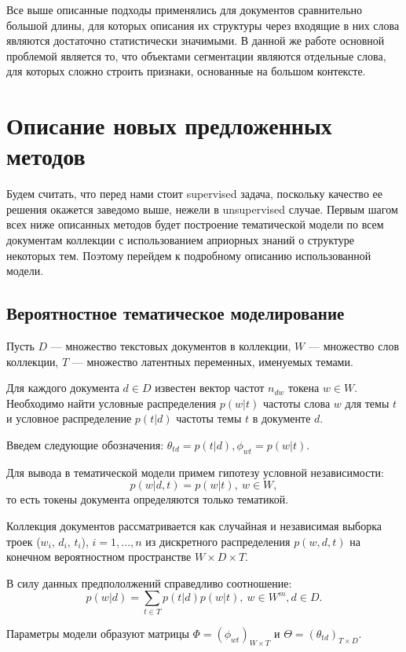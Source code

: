 \documentclass[pdftex,ptm,12pt,a4paper]{report}
\theoremstyle{definition}
\begin{document}
Все выше описанные подходы применялись для документов сравнительно большой длины, для которых описания их структуры через входящие в них слова являются достаточно статистически значимыми. В данной же работе основной проблемой является то, что объектами сегментации являются отдельные слова, для которых сложно строить признаки, основанные на большом контексте. 

\chapter{Описание новых предложенных методов}

Будем считать, что перед нами стоит supervised задача, поскольку качество ее решения окажется заведомо выше, нежели в unsupervised случае. Первым шагом всех ниже описанных методов будет построение тематической модели по всем документам коллекции с использованием априорных знаний о структуре некоторых тем. Поэтому перейдем к подробному описанию использованной модели.

\section{Вероятностное тематическое моделирование}

Пусть $D$ --- множество текстовых документов в коллекции, $W$ --- множество слов коллекции, $T$ --- множество латентных переменных, именуемых темами.

Для каждого документа $d \in D$ известен вектор частот $n_{dw}$ токена $w\in W$.  Необходимо найти условные распределения $p(w|t)$ частоты слова $w$ для темы $t$ и условное распределение $p(t|d)$ частоты темы $t$ в документе $d$. 

Введем следующие обозначения: $\theta_{td} = p(t|d), \phi_{wt} = p(w|t). $   

Для вывода в тематической модели примем гипотезу условной независимости:
\[
	 p(w|d,t) = p(w|t), ~ w \in W,
\]
то есть токены документа определяются только тематикой.

Коллекция документов рассматривается как случайная и независимая выборка
троек ($w_i$, $d_i$, $t_i$), $i = 1,..., n$ из дискретного распределения $p(w, d, t)$ на конечном вероятностном пространстве $W \times D \times T$.

В силу данных предпололжений справедливо соотношение:
\[p(w|d) = \sum_{t\in T}p(t|d)p(w|t), ~ w \in W^{m}, d\in D.\]

Параметры модели образуют матрицы $\Phi = (\phi_{wt})_{W \times T}$ и $\Theta=(\theta_{td})_{T \times D}$.
\end{document}
